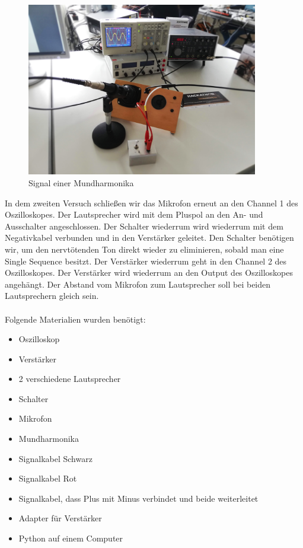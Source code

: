 \documentclass[12pt, oneside, a4paper, \docLanguage]{report}
\begin{document}
\\~\\
\begin{figure}[H]
	\centering\small
	\includegraphics[width=0.9\textwidth]{media/aufbau.jpg}
	\caption{Signal einer Mundharmonika}
	\label{img:Signal einer Mundharmonika}
\end{figure}
\newpage
In dem zweiten Versuch schließen wir das Mikrofon erneut an den Channel 1 des Oszilloskopes. Der Lautsprecher wird mit dem Pluspol an den An- und Ausschalter angeschlossen.
Der Schalter wiederrum wird wiederrum mit dem Negativkabel verbunden und in den Verstärker geleitet. 
\newline
Den Schalter benötigen wir, um den nervtötenden Ton direkt wieder zu eliminieren, sobald man eine Single Sequence besitzt. Der Verstärker wiederrum geht in den Channel 2 des Oszilloskopes. 
Der Verstärker wird wiederrum an den Output des Oszilloskopes angehängt.
\newline
Der Abstand vom Mikrofon zum Lautsprecher soll bei beiden Lautsprechern gleich sein.
\\~\\
Folgende Materialien wurden benötigt: ~\par
\begin{itemize}
	\item Oszilloskop
	\item Verstärker
	\item 2 verschiedene Lautsprecher
	\item Schalter 
	\item Mikrofon
	\item Mundharmonika
	\item Signalkabel Schwarz
	\item Signalkabel Rot
	\item Signalkabel, dass Plus mit Minus verbindet und beide weiterleitet
	\item Adapter für Verstärker
	\item Python auf einem Computer
\end{itemize}
\newpage
\end{document}
